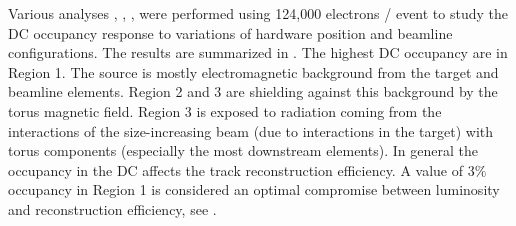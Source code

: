 Various analyses \cite{targetStudy}, \cite{clas12Beamline}, \cite{clas12Background}, were performed using 124,000 electrons / event
to study the DC occupancy response to variations of hardware position and beamline configurations.
The results are summarized in . The highest DC occupancy are in Region 1. The source is mostly electromagnetic background from the target
and beamline elements. Region 2 and 3 are shielding against this background by the torus magnetic field. Region 3 is exposed to radiation coming from
the interactions of the size-increasing beam (due to interactions in the target) with torus components (especially the most downstream elements).
In general the occupancy in the DC affects the track reconstruction efficiency. A value of 3$\%$ occupancy in Region 1
is considered an optimal compromise between luminosity and reconstruction efficiency, see \cite{reco2019}.

